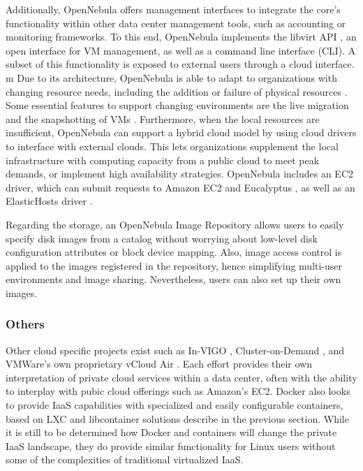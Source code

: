 Additionally, OpenNebula offers management interfaces to integrate the core's functionality within other data center management tools, such as accounting or monitoring frameworks. To this end, OpenNebula implements the libvirt API \cite{www/libvirt}, an open interface for VM management, as well as a command line interface (CLI). A subset of this functionality is exposed to external users through a cloud interface.
m
Due to its architecture, OpenNebula is able to adapt to organizations with changing re­source needs, including the addition or failure of physical resources \cite{sotomayorvirtual}. Some essential features to support changing environments are the live migration and the snapshotting of VMs \cite{www/opennebula}. Furthermore, when the local resources are insufficient, OpenNebula can support a hybrid cloud model by using cloud drivers to inter­face with external clouds. This lets organizations supplement the local infrastructure with computing capacity from a public cloud to meet peak demands, or implement high availability strategies. OpenNebula includes an EC2 driver, which can submit requests to Amazon EC2 \cite{www/amazonec2} and Eucalyptus \cite{nurmi2008eos}, as well as an ElasticHosts driver \cite{www/elastichosts}.

Regarding the storage, an OpenNebula Image Repository allows users to easily specify disk images from a catalog without worrying about low-level disk configuration attributes or block device mapping. Also, image access control is applied to the images registered in the repository, hence simplifying multi-user environments and image sharing. Nevertheless, users can also set up their own images. 


\subsubsection{Others}

Other cloud specific projects exist such as In-VIGO \cite{DBLP:journals/fgcs/AdabalaCCFFKMTZZZZ05}, Cluster-on-Demand \cite{chase2003dvc}, and VMWare's own proprietary vCloud Air \cite{www-vmware-vcloud}.  Each effort provides their own interpretation of private cloud services within a data center, often with the ability to interplay with pubic cloud offerings such as Amazon's EC2. Docker \cite{merkel2014docker} also looks to provide IaaS capabilities with specialized and easily configurable containers, based on LXC and libcontainer solutions describe in the previous section. While it is still to be determined how Docker and containers will change the private IaaS landscape, they do provide similar functionality for Linux users without some of the complexities of traditional virtualized IaaS.  



